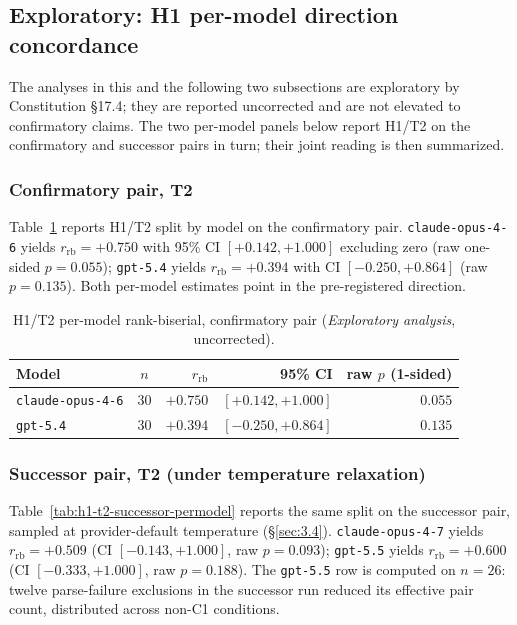 \documentclass[11pt]{article}
\begin{document}
\subsection{Exploratory: H1 per-model direction concordance}
\label{sec:4.3}
The analyses in this and the following two subsections are
exploratory by Constitution \S17.4; they are reported uncorrected
and are not elevated to confirmatory claims. The two per-model
panels below report H1/T2 on the confirmatory and successor pairs
in turn; their joint reading is then summarized.

\subsubsection{Confirmatory pair, T2}
\label{sec:4.3.1}
Table~\ref{tab:h1-t2-confirmatory-permodel} reports H1/T2 split by
model on the confirmatory pair. \texttt{claude-opus-4-6} yields
$r_{\text{rb}} = +0.750$ with 95\% CI $[+0.142, +1.000]$ excluding
zero (raw one-sided $p = 0.055$); \texttt{gpt-5.4} yields
$r_{\text{rb}} = +0.394$ with CI $[-0.250, +0.864]$ (raw $p = 0.135$).
Both per-model estimates point in the pre-registered direction.

\begin{table}[h]
\centering
\small
\caption{H1/T2 per-model rank-biserial, confirmatory pair
(\emph{Exploratory analysis}, uncorrected).}
\label{tab:h1-t2-confirmatory-permodel}
\begin{tabular}{lcrrr}
\toprule
Model & $n$ & $r_{\text{rb}}$ & 95\% CI & raw $p$ (1-sided) \\
\midrule
\texttt{claude-opus-4-6} & 30 & $\mathbf{+0.750}$ & $\mathbf{[+0.142, +1.000]}$ & $0.055$ \\
\texttt{gpt-5.4}         & 30 & $+0.394$          & $[-0.250, +0.864]$          & $0.135$ \\
\bottomrule
\end{tabular}
\end{table}

\subsubsection{Successor pair, T2 (under temperature relaxation)}
\label{sec:4.3.2}
Table~\ref{tab:h1-t2-successor-permodel} reports the same split on
the successor pair, sampled at provider-default temperature
(\S\ref{sec:3.4}). \texttt{claude-opus-4-7} yields
$r_{\text{rb}} = +0.509$ (CI $[-0.143, +1.000]$, raw $p = 0.093$);
\texttt{gpt-5.5} yields $r_{\text{rb}} = +0.600$
(CI $[-0.333, +1.000]$, raw $p = 0.188$). The \texttt{gpt-5.5} row
is computed on $n = 26$: twelve parse-failure exclusions in the
successor run reduced its effective pair count, distributed across
non-C1 conditions.
\end{document}
